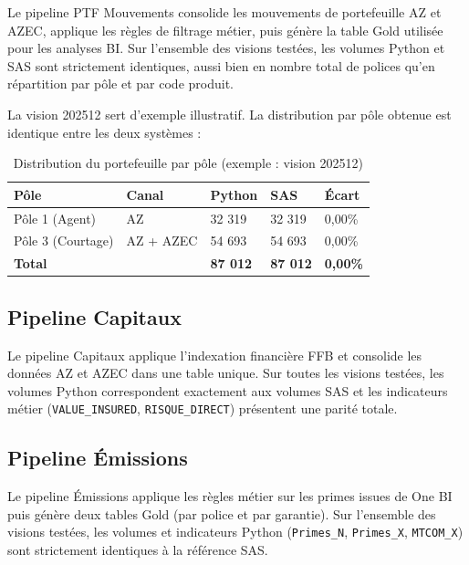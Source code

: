 Le pipeline PTF Mouvements consolide les mouvements de portefeuille AZ et AZEC,
applique les règles de filtrage métier, puis génère la table Gold utilisée pour les
analyses BI. Sur l’ensemble des visions testées, les volumes Python et SAS sont
strictement identiques, aussi bien en nombre total de polices qu’en répartition
par pôle et par code produit.

La vision 202512 sert d'exemple illustratif. La distribution par pôle obtenue
est identique entre les deux systèmes :

\begin{table}[H]
    \centering
    \caption{Distribution du portefeuille par pôle (exemple : vision 202512)}
    \label{tab:distrib_ptf}
    \begin{tabularx}{\textwidth}{|l|l|X|X|X|}
        \hline
        \textbf{Pôle} & \textbf{Canal} & \textbf{Python} & \textbf{SAS} & \textbf{Écart} \\
        \hline
        Pôle 1 (Agent)      & AZ          & 32 319 & 32 319 & 0,00\% \\
        \hline
        Pôle 3 (Courtage)   & AZ + AZEC   & 54 693 & 54 693 & 0,00\% \\
        \hline
        \textbf{Total}       &             & \textbf{87 012} & \textbf{87 012} & \textbf{0,00\%} \\
        \hline
    \end{tabularx}
\end{table}

\subsection{Pipeline Capitaux}

Le pipeline Capitaux applique l’indexation financière FFB et consolide les données
AZ et AZEC dans une table unique. Sur toutes les visions testées, les volumes Python
correspondent exactement aux volumes SAS et les indicateurs métier
(\texttt{VALUE\_INSURED}, \texttt{RISQUE\_DIRECT}) présentent une parité totale.

\subsection{Pipeline Émissions}

Le pipeline Émissions applique les règles métier sur les primes issues de One BI
puis génère deux tables Gold (par police et par garantie). Sur l'ensemble des
visions testées, les volumes et indicateurs Python (\texttt{Primes\_N},
\texttt{Primes\_X}, \texttt{MTCOM\_X}) sont strictement identiques à la
référence SAS.

